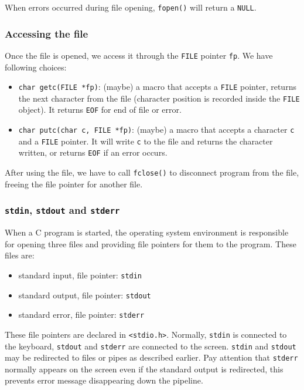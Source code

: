 \documentclass[11pt]{article}
\begin{document}
When errors occurred during file opening, \texttt{fopen()} will return a \texttt{NULL}.
\subsubsection{Accessing the file}
\label{sec:org721a8b6}
Once the file is opened, we access it through the \texttt{FILE} pointer \texttt{fp}. We have following choices:
\begin{itemize}
\item \texttt{char getc(FILE *fp)}: (maybe) a macro that accepts a \texttt{FILE} pointer, returns the next character from the file (character position is recorded inside the \texttt{FILE} object). It returns \texttt{EOF} for end of file or error.
\item \texttt{char putc(char c, FILE *fp)}: (maybe) a macro that accepts a character \texttt{c} and a \texttt{FILE} pointer. It will write \texttt{c} to the file and returns the character written, or returns \texttt{EOF} if an error occurs.
\end{itemize}

After using the file, we have to call \texttt{fclose()} to disconnect program from the file, freeing the file pointer for another file.

\subsubsection{\texttt{stdin}, \texttt{stdout} and \texttt{stderr}}
\label{sec:orgcc53250}
When a C program is started, the operating system environment is responsible for opening three files and providing file pointers for them to the program. These files are:
\begin{itemize}
\item standard input, file pointer: \texttt{stdin}
\item standard output, file pointer: \texttt{stdout}
\item standard error, file pointer: \texttt{stderr}
\end{itemize}
These file pointers are declared in \texttt{<stdio.h>}. Normally, \texttt{stdin} is connected to the keyboard, \texttt{stdout} and \texttt{stderr} are connected to the screen. \texttt{stdin} and \texttt{stdout} may be redirected to files or pipes as described earlier. Pay attention that \texttt{stderr} normally appears on the screen even if the standard output is redirected, this prevents error message disappearing down the pipeline. 
\end{document}
